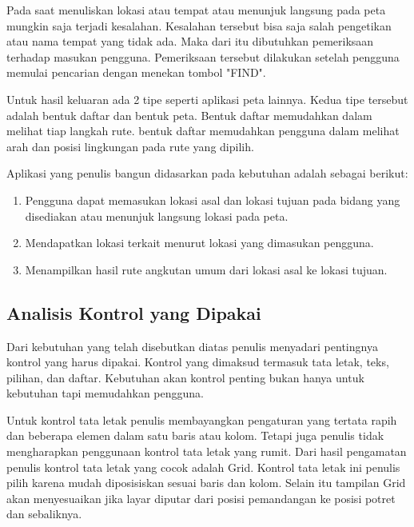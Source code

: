 \hspace{0.5cm} Pada saat menuliskan lokasi atau tempat atau menunjuk langsung pada peta mungkin saja terjadi kesalahan. Kesalahan tersebut bisa saja salah pengetikan atau nama tempat yang tidak ada. Maka dari itu dibutuhkan pemeriksaan terhadap masukan pengguna. Pemeriksaan tersebut dilakukan setelah pengguna memulai pencarian dengan menekan tombol "FIND".

\hspace{0.5cm} Untuk hasil keluaran ada 2 tipe seperti aplikasi peta lainnya. Kedua tipe tersebut adalah bentuk daftar dan bentuk peta. Bentuk daftar memudahkan dalam melihat tiap langkah rute. bentuk daftar memudahkan pengguna dalam melihat arah dan posisi lingkungan pada rute yang dipilih.

\hspace{0.5cm} Aplikasi yang penulis bangun didasarkan pada kebutuhan adalah sebagai berikut:
\begin{enumerate}
	\item Pengguna dapat memasukan lokasi asal dan lokasi tujuan pada bidang yang disediakan atau menunjuk langsung lokasi pada peta.
	\item Mendapatkan lokasi terkait menurut lokasi yang dimasukan pengguna.
	\item Menampilkan hasil rute angkutan umum dari lokasi asal ke lokasi tujuan.
\end{enumerate}

\subsection{Analisis Kontrol yang Dipakai}
\label{lab:Analisis Kontrol yang Dipakai}
\hspace{0.5cm} Dari kebutuhan yang telah disebutkan diatas penulis menyadari pentingnya kontrol yang harus dipakai. Kontrol yang dimaksud termasuk tata letak, teks, pilihan, dan daftar. Kebutuhan akan kontrol penting bukan hanya untuk kebutuhan tapi memudahkan pengguna. 

\hspace{0.5cm} Untuk kontrol tata letak penulis membayangkan pengaturan yang tertata rapih dan beberapa elemen dalam satu baris atau kolom. Tetapi juga penulis tidak mengharapkan penggunaan kontrol tata letak yang rumit. Dari hasil pengamatan penulis kontrol tata letak yang cocok adalah Grid. Kontrol tata letak ini penulis pilih karena mudah diposisiskan sesuai baris dan kolom. Selain itu tampilan Grid akan menyesuaikan jika layar diputar dari posisi pemandangan ke posisi potret dan sebaliknya.

